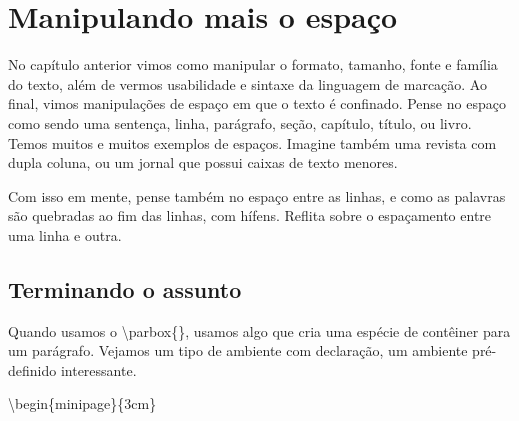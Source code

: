 \chapter{Manipulando mais o espaço}
No capítulo anterior vimos como manipular o formato, tamanho, fonte e família do texto,
além de vermos usabilidade e sintaxe da linguagem de marcação.
Ao final, vimos manipulações de espaço em que o texto é confinado.
Pense no espaço como sendo uma sentença, linha, parágrafo, seção,
capítulo, título, ou livro.
Temos muitos e muitos exemplos de espaços.
Imagine também uma revista com dupla coluna,
ou um jornal que possui caixas de texto menores.

Com isso em mente, pense também no espaço entre as linhas,
e como as palavras são quebradas ao fim das linhas, com hífens.
Reflita sobre o espaçamento entre uma linha e outra.

\section{Terminando o assunto}
Quando usamos o \textbackslash parbox\{\}, usamos algo que cria uma espécie de contêiner para um parágrafo.
Vejamos um tipo de ambiente com declaração, um ambiente pré-definido interessante.

\textbackslash begin\{minipage\}\{3cm\}

\newpage
